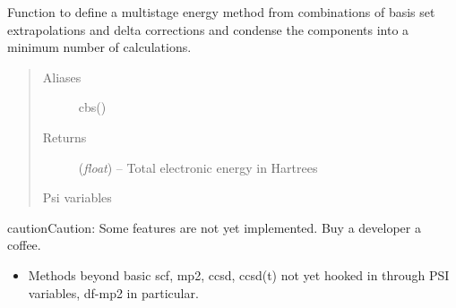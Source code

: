 \documentclass[letterpaper,10pt,english]{sphinxmanual}
\begin{document}
\begin{fulllineitems}
\label{cbs:wrappers.complete_basis_set}
Function to define a multistage energy method from combinations of
basis set extrapolations and delta corrections and condense the
components into a minimum number of calculations.
\begin{quote}\begin{description}
\item[{Aliases }] \leavevmode
cbs()

\item[{Returns}] \leavevmode
(\emph{float}) -- Total electronic energy in Hartrees

\item[{Psi variables}] \leavevmode
\end{description}\end{quote}

\begin{fulllineitems}
\label{cbs:envvar-CBSTOTALENERGY}\label{cbs:envvar-CBSREFERENCEENERGY}\label{cbs:envvar-CBSCORRELATIONENERGY}\label{cbs:envvar-CURRENTENERGY}\label{cbs:envvar-CURRENTREFERENCEENERGY}\label{cbs:envvar-CURRENTCORRELATIONENERGY}
\end{fulllineitems}


\begin{notice}{caution}{Caution:}
Some features are not yet implemented. Buy a developer a coffee.
\begin{itemize}
\item {} 
Methods beyond basic scf, mp2, ccsd, ccsd(t) not yet hooked in through PSI variables, df-mp2 in particular.


\end{itemize}
\end{notice}
\end{fulllineitems}
\end{document}
